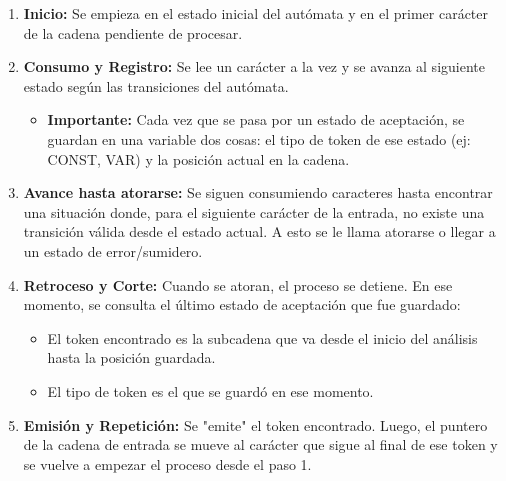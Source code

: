 \begin{enumerate}
    \item \textbf{Inicio:} Se empieza en el estado inicial del autómata y en el primer carácter de la cadena pendiente de procesar.

    \item \textbf{Consumo y Registro:} Se lee un carácter a la vez y se avanza al siguiente estado según las transiciones del autómata.
    \begin{itemize}
        \item \textbf{Importante:} Cada vez que se pasa por un estado de aceptación, se guardan en una variable dos cosas: el tipo de token de ese estado (ej: CONST, VAR) y la posición actual en la cadena.
    \end{itemize}

    \item \textbf{Avance hasta atorarse:} Se siguen consumiendo caracteres hasta encontrar una situación donde, para el siguiente carácter de la entrada, no existe una transición válida desde el estado actual. A esto se le llama atorarse o llegar a un estado de error/sumidero.

    \item \textbf{Retroceso y Corte:} Cuando se atoran, el proceso se detiene. En ese momento, se consulta el último estado de aceptación que fue guardado:
    \begin{itemize}
        \item El token encontrado es la subcadena que va desde el inicio del análisis hasta la posición guardada.
        \item El tipo de token es el que se guardó en ese momento.
    \end{itemize}

    \item \textbf{Emisión y Repetición:} Se "emite" el token encontrado. Luego, el puntero de la cadena de entrada se mueve al carácter que sigue al final de ese token y se vuelve a empezar el proceso desde el paso 1.
\end{enumerate}



